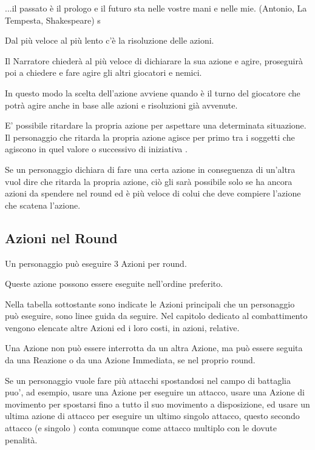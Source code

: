 \documentclass[a4paper,11pt,twoside,openany]{book}
\begin{document}
\begin{tcolorbox}[enhanced,arc=5pt,boxrule=0.3pt]{
...il passato è il prologo e il futuro sta nelle vostre mani e nelle mie. (Antonio, La Tempesta, Shakespeare)}
s\end{tcolorbox}\medskip


\label{risoluzione-delle-azioni}

Dal più veloce al più lento c'è la risoluzione delle azioni.

Il Narratore chiederà al più veloce di dichiarare la sua azione e agire, proseguirà poi a chiedere e fare agire gli altri giocatori e nemici.

In questo modo la scelta dell'azione avviene quando è il turno del giocatore che potrà agire anche in base alle azioni e risoluzioni già avvenute.

E' possibile ritardare la propria azione per aspettare una determinata situazione. Il personaggio che ritarda la propria azione agisce per primo tra i soggetti che agiscono in quel valore o successivo di iniziativa .

Se un personaggio dichiara di fare una certa azione in conseguenza di un'altra vuol dire che ritarda la propria azione, ciò gli sarà possibile solo se ha ancora azioni da spendere nel round ed è più veloce di colui che deve compiere l'azione che scatena l'azione.

\subsection{Azioni nel Round}

\label{azioni-nel-round}

Un personaggio può eseguire 3 Azioni per round.

Queste azione possono essere eseguite nell'ordine preferito.

Nella tabella sottostante sono indicate le Azioni principali che un personaggio può eseguire, sono linee guida da seguire. Nel capitolo dedicato al combattimento vengono elencate altre Azioni ed i loro costi, in azioni, relative.

Una Azione non può essere interrotta da un altra Azione, ma può essere seguita da una Reazione o da una Azione Immediata, se nel proprio round.

Se un personaggio vuole fare più attacchi spostandosi nel campo di battaglia puo', ad esempio, usare una Azione per eseguire un attacco, usare una Azione di movimento per spostarsi fino a tutto il suo movimento a disposizione, ed usare un ultima azione di attacco per eseguire un ultimo singolo attacco, questo secondo attacco (e singolo ) conta comunque come attacco multiplo con le dovute penalità.
\end{document}
